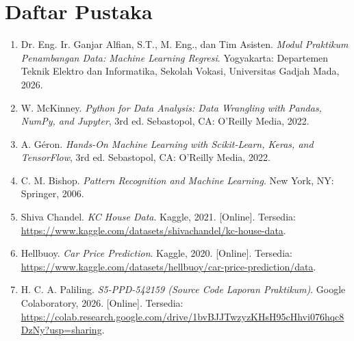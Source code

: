 \documentclass[a4paper,oneside,11pt]{book}
\begin{document}
\chapter{Daftar Pustaka}
\begin{enumerate}
    \item \label{modulPraktikum} Dr. Eng. Ir. Ganjar Alfian, S.T., M. Eng., dan Tim Asisten. \textit{Modul Praktikum Penambangan Data: Machine Learning Regresi}. Yogyakarta: Departemen Teknik Elektro dan Informatika, Sekolah Vokasi, Universitas Gadjah Mada, 2026.
    
    \item \label{mckinney} W. McKinney. \textit{Python for Data Analysis: Data Wrangling with Pandas, NumPy, and Jupyter}, 3rd ed. Sebastopol, CA: O'Reilly Media, 2022.
    
    \item \label{geron} A. Géron. \textit{Hands-On Machine Learning with Scikit-Learn, Keras, and TensorFlow}, 3rd ed. Sebastopol, CA: O'Reilly Media, 2022.
    
    \item \label{bishop} C. M. Bishop. \textit{Pattern Recognition and Machine Learning}. New York, NY: Springer, 2006.
    
    \item \label{kaggleHouse} Shiva Chandel. \textit{KC House Data}. Kaggle, 2021. [Online]. Tersedia: \url{https://www.kaggle.com/datasets/shivachandel/kc-house-data}.
    
    \item \label{kaggleCar} Hellbuoy. \textit{Car Price Prediction}. Kaggle, 2020. [Online]. Tersedia: \url{https://www.kaggle.com/datasets/hellbuoy/car-price-prediction/data}.
    
    \item \label{colabLaporan} H. C. A. Paliling. \textit{S5-PPD-542159 (Source Code Laporan Praktikum)}. Google Colaboratory, 2026. [Online]. Tersedia: \url{https://colab.research.google.com/drive/1bvBJJTwzyzKHsH95cHhvi076hqc8DzNy?usp=sharing}.
\end{enumerate}
\end{document}
